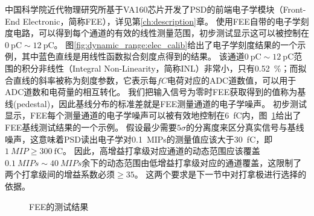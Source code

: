 中国科学院近代物理研究所基于VA160芯片开发了PSD的前端电子学模块（Front-End Electronic，简称FEE），详见第\ref{ch:description}章。
使用FEE自带的电子学刻度电路，可以得到每个通道的有效的线性测量范围，初步测试显示这可以被控制在$\SI{0}{\pico\coulomb}\sim\SI{12}{\pico\coulomb}$。
图\ref{fig:dynamic_range:elec_calib}给出了电子学刻度结果的一个示例，其中蓝色直线是用线性函数拟合刻度点得到的结果。
该通道$\SI{0}{\pico\coulomb}\sim\SI{12}{\pico\coulomb}$范围的积分非线性（Integral Non-Linearity，简称INL）非常小，只有\SI{0.52}{\percent}；而拟合直线的斜率被称为刻度参数，它表示每$fC$电荷对应的ADC道数值，可以用于ADC道数和电荷量的相互转化。
我们把输入信号为零时FEE获取得到的值称为基线(pedestal)，因此基线分布的标准差就是FEE测量通道的电子学噪声。
初步测试显示，FEE每个测量通道的电子学噪声可以被有效地控制在\SI{6}{\femto\coulomb}内，图~\ref{fig:dynamic_range:fee_test}给出了FEE基线测试结果的一个示例。
假设最少需要$5\sigma$的分离度来区分真实信号与基线噪声，这意味着PSD读出电子学对\SI{0.1}{MIPs}的测量值应该大于\SI{30}{\femto\coulomb}，即$\SI{1}{MIP} \ge \SI{300}{\femto\coulomb}$。
因此，高增益打拿级对应通道的动态范围应该覆盖$\SI{0.1}{MIPs}\sim\SI{40}{MIPs}$余下的动态范围由低增益打拿级对应的通道覆盖，这限制了两个打拿级间的增益系数必须$\ge 35$。
这两个要求是下一节中对打拿极进行选择的依据。

\begin{figure}[!htb]
\centering
{}
{}
\label{fig:dynamic_range:fee_test}
\caption{FEE的测试结果}
\end{figure}

